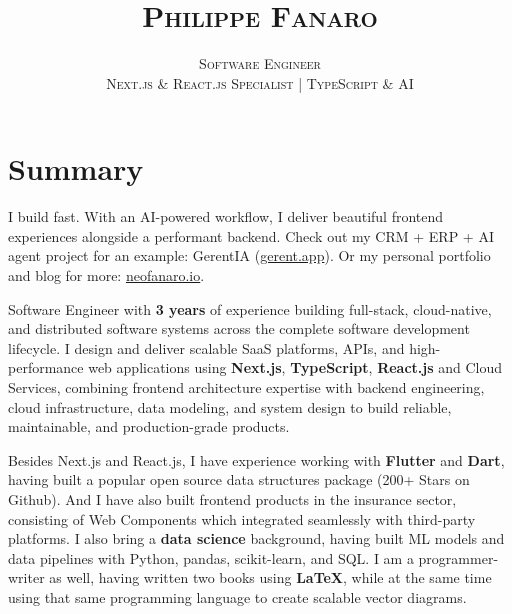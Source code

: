 \documentclass[12pt]{extarticle}
\title{\scshape \huge \vspace{-2.2cm} Philippe Fanaro\\[0.2cm]}
\author{%
  \scshape \Large Software Engineer%
  \\[0.5cm]%
  \scshape \fontsize{19pt}{22pt}\selectfont Next.js \& React.js Specialist | TypeScript \& AI%
}
\date{}
\renewcommand{\_}{\leavevmode\kern.06em\vbox{\hrule width.425em}}
\newenvironment{cssquote}{%
  \begin{mdframed}[style=CSSquote]
}{%
  \end{mdframed}
}
\begin{document}
\maketitle

\section{Summary}

I build fast. With an AI-powered workflow, I deliver beautiful frontend experiences alongside a performant backend. Check out my CRM + ERP + AI agent project for an example: GerentIA (\href{https://gerent.app}{gerent.app}). Or my personal portfolio and blog for more: \href{https://neofanaro.io}{neofanaro.io}.

\vspace{0.2cm}

Software Engineer with \textbf{3\raisebox{0.32ex}{\scriptsize+} years} of experience building full-stack, cloud-native, and distributed software systems across the complete software development lifecycle. I design and deliver scalable SaaS platforms, APIs, and high-performance web applications using \textbf{Next.js}, \textbf{TypeScript}, \textbf{React.js} and Cloud Services, combining frontend architecture expertise with backend engineering, cloud infrastructure, data modeling, and system design to build reliable, maintainable, and production-grade products.

\vspace{0.2cm}

Besides Next.js and React.js, I have experience working with \textbf{Flutter} and \textbf{Dart}, having built a popular open source data structures package (200+ Stars on Github). And I have also built frontend products in the insurance sector, consisting of Web Components which integrated seamlessly with third-party platforms. I also bring a \textbf{data science} background, having built ML models and data pipelines with Python, pandas, scikit-learn, and SQL. I am a programmer-writer as well, having written two books using \textbf{\LaTeX}, while at the same time using that same programming language to create scalable vector diagrams.


\end{document}
